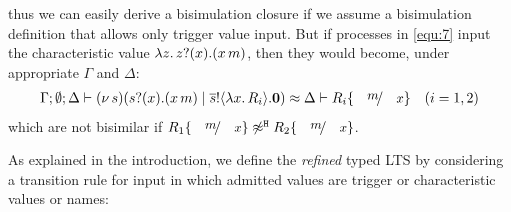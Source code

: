\begin{example}
\noi thus we can easily derive a bisimulation closure if we 
assume a bisimulation definition that allows only trigger value input.
%
But if processes in \eqref{equ:7}
input the characteristic value $\lambda z.\,z ? (x) . (x\, {m})$,  
then they would become, under appropriate $\Gamma$ and $\Delta$:
%
\begin{eqnarray*}
	\Gamma; \es; \Delta \proves \newsp{s}{\binp{s}{x} (\appl{x}{m}) \Par \bout{\dual{s}}{\abs{x} R_i} \inact} \wbc \Delta \proves R_i \subst{m}{x}
\quad (i=1,2)
\end{eqnarray*}
\noi which are not bisimilar if $R_1 \subst{m}{x} \not\wb R_2 \subst{m}{x}$.
\end{example}

\noi As explained in 
the introduction,
we define the
\emph{refined} typed LTS
by considering a transition rule for input in which admitted values are
trigger or characteristic values or names:


